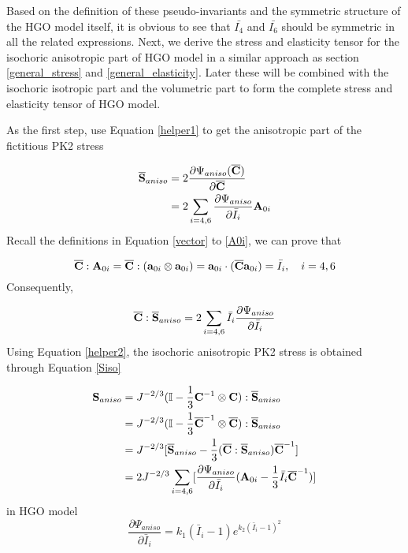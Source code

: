 Based on the definition of these pseudo-invariants and the symmetric structure of the HGO model itself, it is obvious to see that $\bar{I_4}$ and $\bar{I_6}$ should be symmetric in all the related expressions. Next, we derive the stress and elasticity tensor for the isochoric anisotropic part of HGO model in a similar approach as section \ref{general_stress} and \ref{general_elasticity}. Later these will be combined with the isochoric isotropic part and the volumetric part to form the complete stress and elasticity tensor of HGO model.

As the first step, use Equation \ref{helper1} to get the anisotropic part of the fictitious PK2 stress

\begin{equation} \label{Sbar3}
\begin{split}
\overline{\bold{S}}_{aniso} &=  2\frac{\partial\Psi_{aniso}({\overline{\bold{C}})}}{\partial\overline{\bold{C}}} \\
&= 2\sum_{i = 4, 6}\frac{\partial{\Psi_{aniso}}}{\partial{\bar{I}_i}}\bold{A}_{0i} 
\end{split}
\end{equation}
Recall the definitions in Equation \ref{vector} to \ref{A0i}, we can prove that

\begin{equation}
\overline{\bold{C}} : \bold{A}_{0i} = \overline{\bold{C}} : (\bold{a}_{0i} \otimes \bold{a}_{0i}) = \bold{a}_{0i} \cdot (\overline{\bold{C}} \bold{a}_{0i}) = \bar{I}_i, \quad i = 4, 6
\end{equation}
Consequently, 

\begin{equation} \label{helper2}
\overline{\bold{C}} : \overline{\bold{S}}_{aniso} = 2\sum_{i = 4, 6} \bar{I}_i \frac{\partial{\Psi_{aniso}}}{\partial{\bar{I}_i}}  
\end{equation}
Using Equation \ref{helper2}, the isochoric anisotropic PK2 stress is obtained through Equation \ref{Siso}

\begin{equation} \label{Sanisotropic}
\begin{split}
\bold{S}_{aniso} &=J^{-2/3}(\mathbb{I} - \frac{1}{3}{{\bold{C}}}^{-1} \otimes {\bold{C}}) : \overline{\bold{S}}_{aniso}  \\
&= J^{-2/3}(\mathbb{I} - \frac{1}{3}{\overline{\bold{C}}}^{-1} \otimes \overline{\bold{C}}) : \overline{\bold{S}}_{aniso} \\
&= J^{-2/3}[\overline{\bold{S}}_{aniso} - \frac{1}{3}(\overline{\bold{C}} : \overline{\bold{S}}_{aniso}){\overline{\bold{C}}}^{-1}] \\
&= 2J^{-2/3} \sum_{i = 4, 6}[\frac{\partial{\Psi_{aniso}}}{\partial{\bar{I}_i}}  (\bold{A}_{0i} - \frac{1}{3}\bar{I}_i\overline{\bold{C}}^{-1})]
\end{split}
\end{equation}
in HGO model
\begin{equation} \label{HGOderivative1}
\frac{\partial\Psi_{aniso}}{\partial{\bar{I}_i}} = k_1(\bar{I}_i - 1)e^{k_2(\bar{I}_i - 1)^2}
\end{equation}


